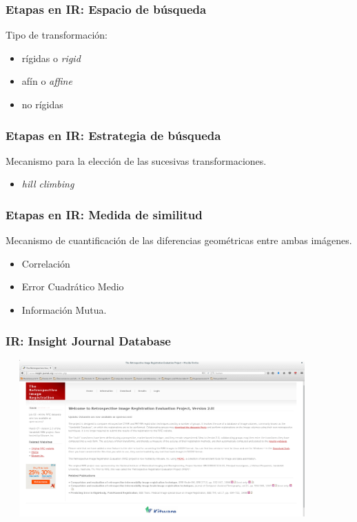 \documentclass{beamer} %
\begin{document}
\begin{frame}
\frametitle{Etapas en IR: Espacio de búsqueda}

Tipo de transformación:

\pause
\begin{itemize}
\item rígidas o \textit{rigid}
\item afín o \textit{affine}
\item no rígidas
\end{itemize}

\end{frame}

\begin{frame}
\frametitle{Etapas en IR: Estrategia de búsqueda}

Mecanismo para la elección de las sucesivas transformaciones.

\pause
\begin{itemize}
\item \textit{hill climbing}
\end{itemize}

\end{frame}

\begin{frame}
\frametitle{Etapas en IR: Medida de similitud}

Mecanismo de cuantificación de las diferencias geométricas entre ambas imágenes.

\pause
\begin{itemize}
\item Correlación
\item Error Cuadrático Medio
\item Información Mutua.
\end{itemize}

\end{frame}

\begin{frame}
\frametitle{IR: Insight Journal Database}
\href{http://www.insight-journal.org/}{\includegraphics[height=6cm, width=12cm]{images/IJD.png}}
\end{frame}
\end{document}
